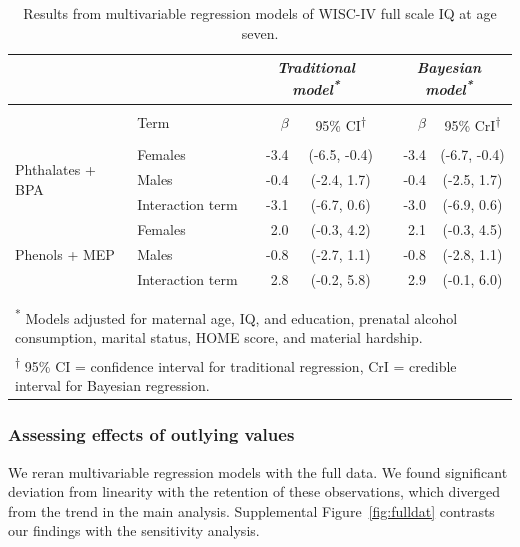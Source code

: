 \begingroup
\renewcommand{\arraystretch}{1.25}
\begin{table}[!ht] \centering 
  \caption[Multivariable regression models of WISC-IV full scale IQ]{Results from multivariable regression models of WISC-IV full scale IQ at age seven.} 
  \label{tab:reg} 
\begin{tabular}{llrcrc} 
& & \multicolumn{2}{c}{\textit{Traditional model\textsuperscript{*}}} & \multicolumn{2}{c}{\textit{Bayesian model\textsuperscript{*}}} \\
\hline 
\\[-3ex] \hline
 & Term & $\beta$ & 95\% CI\textsuperscript{$\dagger$} & $\beta$ & 95\% CrI\textsuperscript{$\dagger$} \\ 
\hline 
\\[-3ex] \hline
\multirow{3}{*}{Phthalates + BPA} & Females          & -3.4  & (-6.5, -0.4) &  -3.4 & (-6.7, -0.4) \\ 
                           & Males            & -0.4 & (-2.4, 1.7)   &  -0.4 & (-2.5, 1.7) \\ 
                           & Interaction term & -3.1 & (-6.7, 0.6)   &  -3.0 & (-6.9, 0.6) \\ 
\hline
\multirow{3}{*}{Phenols + MEP} & Females          & 2.0   & (-0.3, 4.2) & 2.1 & (-0.3, 4.5) \\ 
                           & Males            & -0.8  & (-2.7, 1.1) & -0.8 & (-2.8, 1.1) \\ 
                           & Interaction term & 2.8   & (-0.2, 5.8) & 2.9 & (-0.1, 6.0) \\ 
\hline 
\\[-3ex] \hline \\[-2.5ex]
\multicolumn{6}{p{0.85\linewidth}}{\textsuperscript{*} Models adjusted for maternal age, IQ, and education, prenatal alcohol consumption, marital status, HOME score, and material hardship.} \\
\multicolumn{6}{p{0.85\linewidth}}{\textsuperscript{$\dagger$} 95\% CI = confidence interval for traditional regression, CrI = credible interval for Bayesian regression.} \\
\end{tabular} 
\end{table} 
\endgroup

\subsubsection{Assessing effects of outlying values}
We reran multivariable regression models with the full data. We found significant deviation from linearity with the retention of these observations, which diverged from the trend in the main analysis. Supplemental Figure~\ref{fig:fulldat} contrasts our findings with the sensitivity analysis.

